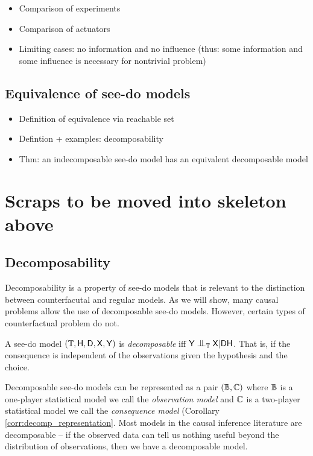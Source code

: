 \begin{itemize}
    \item Comparison of experiments
    \item Comparison of actuators
    \item Limiting cases: no information and no influence (thus: some information and some influence is necessary for nontrivial problem)
\end{itemize}

\subsection{Equivalence of see-do models}

\begin{itemize}
    \item Definition of equivalence via reachable set
    \item Defintion + examples: decomposability
    \item Thm: an indecomposable see-do model has an equivalent decomposable model
\end{itemize}

\section{Scraps to be moved into skeleton above}

\subsection{Decomposability}

Decomposability is a property of see-do models that is relevant to the distinction between counterfacutal and regular models. As we will show, many causal problems allow the use of decomposable see-do models. However, certain types of counterfactual problem do not.

\begin{definition}[decomposability]\label{def:decomposability}
A see-do model $(\mathbb{T},\mathsf{H},\mathsf{D},\mathsf{X},\mathsf{Y})$ is \emph{decomposable} iff $\RV{Y}\CI_\kernel{T} \RV{X}|\RV{D}\RV{H}$. That is, if the consequence is independent of the observations given the hypothesis and the choice.
\end{definition}

Decomposable see-do models can be represented as a pair $(\mathbb{B},\mathbb{C})$ where $\mathbb{B}$ is a one-player statistical model we call the \emph{observation model} and $\mathbb{C}$ is a two-player statistical model we call the \emph{consequence model} (Corollary \ref{corr:decomp_representation}. Most models in the causal inference literature are decomposable -- if the observed data can tell us nothing useful beyond the distribution of observations, then we have a decomposable model.

